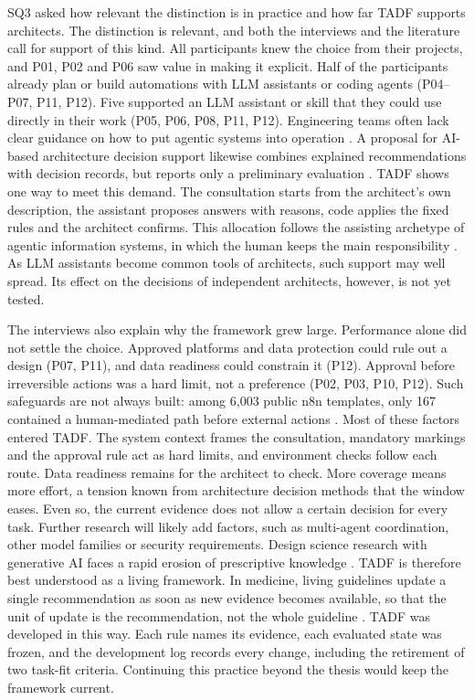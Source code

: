 SQ3 asked how relevant the distinction is in practice and how far TADF supports architects. The distinction is relevant, and both the interviews and the literature call for support of this kind. All participants knew the choice from their projects, and P01, P02 and P06 saw value in making it explicit. Half of the participants already plan or build automations with LLM assistants or coding agents (P04--P07, P11, P12). Five supported an LLM assistant or skill that they could use directly in their work (P05, P06, P08, P11, P12). Engineering teams often lack clear guidance on how to put agentic systems into operation \parencite{bandaraPracticalGuideAgentic2026}. A proposal for AI-based architecture decision support likewise combines explained recommendations with decision records, but reports only a preliminary evaluation \parencite{arifAIDrivenDecisionSupport2025}. TADF shows one way to meet this demand. The consultation starts from the architect's own description, the assistant proposes answers with reasons, code applies the fixed rules and the architect confirms. This allocation follows the assisting archetype of agentic information systems, in which the human keeps the main responsibility \parencite{holldackAgenticInformationSystems2026}. As LLM assistants become common tools of architects, such support may well spread. Its effect on the decisions of independent architects, however, is not yet tested.

The interviews also explain why the framework grew large. Performance alone did not settle the choice. Approved platforms and data protection could rule out a design (P07, P11), and data readiness could constrain it (P12). Approval before irreversible actions was a hard limit, not a preference (P02, P03, P10, P12). Such safeguards are not always built: among 6,003 public n8n templates, only 167 contained a human-mediated path before external actions \parencite{tangCharacterizingLargeLanguage2026}. Most of these factors entered TADF. The system context frames the consultation, mandatory markings and the approval rule act as hard limits, and environment checks follow each route. Data readiness remains for the architect to check. More coverage means more effort, a tension known from architecture decision methods \parencite{falessiDecisionmakingTechniquesSoftware2011} that the window eases. Even so, the current evidence does not allow a certain decision for every task. Further research will likely add factors, such as multi-agent coordination, other model families or security requirements. Design science research with generative AI faces a rapid erosion of prescriptive knowledge \parencite{zurheidenDesignScienceResearch2026}. TADF is therefore best understood as a living framework. In medicine, living guidelines update a single recommendation as soon as new evidence becomes available, so that the unit of update is the recommendation, not the whole guideline \parencite{aklLivingSystematicReviews2017}. TADF was developed in this way. Each rule names its evidence, each evaluated state was frozen, and the development log records every change, including the retirement of two task-fit criteria. Continuing this practice beyond the thesis would keep the framework current.

